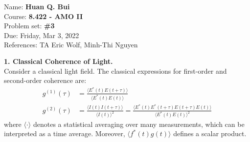 \documentclass{article}
\theoremstyle{definition}
\newcommand{\f}[2]{\frac{#1}{#2}}
\begin{document}
\begin{framed}
\noindent Name: \textbf{Huan Q. Bui}\\
Course: \textbf{8.422 - AMO II}\\
Problem set: \textbf{\#3}\\
Due: Friday, Mar 3, 2022\\
References: TA Eric Wolf, Minh-Thi Nguyen
\end{framed}
	
	
\noindent \textbf{1. Classical Coherence of Light.} \\

\noindent Consider a classical light field. The classical expressions for first-order and second-order coherence are:
\begin{align*}
g^{(1)}(\tau) &= \f{\langle E^*(t) E (t+\tau)\rangle}{\langle E^*(t) E(t) \rangle} \\
g^{(2)}(\tau) &= \f{\langle I(t) I (t+\tau) \rangle }{\langle I(t) \rangle^2} 
= \f{\langle  E^*(t) E^*(t+\tau) E(t+\tau) E(t)   \rangle }{\langle E^*(t) E(t) \rangle^2}
\end{align*}
where $\langle \cdot \rangle$ denotes a statistical averaging over many measurements, which can be interpreted as a time average. Moreover, $\langle f^*(t) g(t)\rangle$ defines a scalar product. 
\end{document}
